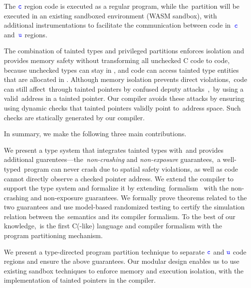 The $\textcolor{blue}{\texttt{c}}$ region code is executed as a regular program, while the~\ucregion partition will be executed in an existing sandboxed environment (\eg WASM sandbox), with additional instrumentations to facilitate the communication between code in~$\textcolor{blue}{\texttt{c}}$ and~$\textcolor{blue}{\texttt{u}}$ regions.

The combination of tainted types and privileged partitions
enforces isolation and provides memory safety without transforming all unchecked C code to \checkedc code,
because unchecked types can stay in \ucregion, and \cregion code can access tainted type entities that are allocated 
in \ucregion.
% 
Although memory isolation prevents direct violations,~\ucregion code can still affect~\cregion through tainted pointers by confused deputy attacks~\cite{rajani2016access, machiry2017boomerang},~\eg by using a valid~\cregion address in a tainted pointer.
Our compiler avoids these attacks by ensuring using dynamic checks that tainted pointers validly point to~\ucregion address space.
Such checks are statically generated by our compiler.

In summary, we make the following three main contributions.

We present a type system that integrates tainted types with~\checkedc and provides additional guarentees---the~\emph{non-crashing} and \emph{non-exposure} guarantees,~\ie a well-typed~\systemname program can never crash due to spatial safety violations,
as well as \ucregion code cannot directly observe a checked pointer address.
We extend the \checkedc compiler to support the type system and
formalize it by extending~\checkedc formalism~\cite{li22checkedc} with the non-crashing and non-exposure guarantees.
We formally prove theorems related to the two guarantees and use model-based randomized testing \cite{Pierce:SF4} to certify the simulation relation between the~\systemname semantics and its compiler formalism.
To the best of our knowledge,~\systemname is the first C(-like) language and compiler formalism with the program partitioning mechanism.

We present a type-directed program partition technique to separate $\textcolor{blue}{\texttt{c}}$ and $\textcolor{blue}{\texttt{u}}$ code regions and ensure the above guarantees.
Our modular design enables us to use existing sandbox techniques to enforce memory and execution isolation, with the implementation of tainted pointers in the \systemname compiler.

